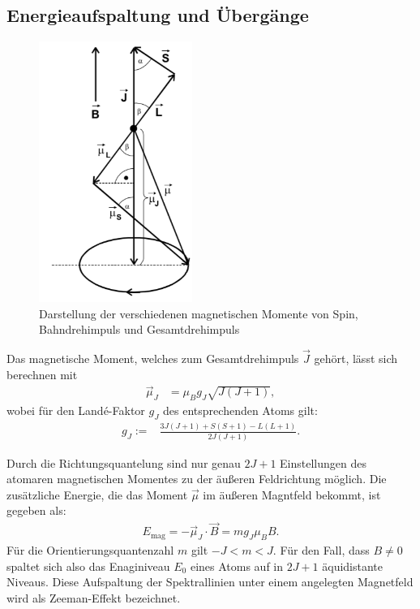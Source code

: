 \subsection{Energieaufspaltung und Übergänge}
%
\begin{figure}[h!]
  \centering
  \includegraphics[width=5cm]{magmom1.png}
  \caption{Darstellung der verschiedenen magnetischen Momente von Spin, Bahndrehimpuls und Gesamtdrehimpuls}
  \label{fig:mag}
\end{figure}
%
Das magnetische Moment, welches zum Gesamtdrehimpuls $\vec{J}$ gehört, lässt sich berechnen mit
\begin{align*}
  \vec{\mu}_J&=\mu_Bg_J\sqrt{J(J+1)},
\end{align*}
wobei für den Landé-Faktor $g_J$ des entsprechenden Atoms gilt:
\begin{align}
		g_J:=&\frac{3J(J+1)+S(S+1)-L(L+1)}{2J(J+1)}.
\end{align}
\FloatBarrier

Durch die Richtungsquantelung sind nur genau $2J+1$ Einstellungen des atomaren magnetischen Momentes zu der äußeren Feldrichtung möglich.
Die zusätzliche Energie, die das Moment $\vec{\mu}$ im äußeren Magntfeld bekommt, ist gegeben als:
\begin{align*}
  E_{\text{mag}} = -\vec{\mu}_J \cdot \vec{B} = mg_J\mu_B B.
\end{align*}
Für die Orientierungsquantenzahl $m$ gilt $-J < m < J$.
Für den Fall, dass $B \ne 0$ spaltet sich also das Enaginiveau $E_0$ eines Atoms auf in $2J+1$ äquidistante Niveaus.
Diese Aufspaltung der Spektrallinien unter einem angelegten Magnetfeld wird als Zeeman-Effekt bezeichnet.

